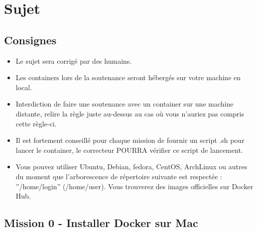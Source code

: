 \documentclass{42}
\begin{document}
	\newpage

\chapter{Sujet}

\section{Consignes}
\begin{itemize}
	\item Le sujet sera corrigé par des humains.
	\item Les containers lors de la soutenance seront hébergés sur votre machine en local.
	\item Interdiction de faire une soutenance avec un container sur une machine distante, relire la règle juste au-dessus au cas où vous n’auriez pas compris cette règle-ci.
	\item Il est fortement conseillé pour chaque mission de fournir un script .sh pour lancer le container, le correcteur POURRA vérifier ce script de lancement.
	\item Vous pouvez utiliser Ubuntu, Debian, fedora, CentOS, ArchLinux ou autres du moment que l'arborescence de répertoire suivante est respectée : ''/home/login'' (/home/user). Vous trouverez des images officielles sur Docker Hub.
\end{itemize}

	\newpage

\section{Mission 0 - Installer Docker sur Mac}
\end{document}
